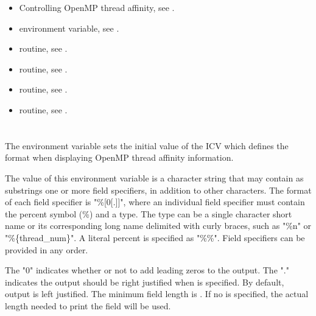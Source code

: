 \crossreferences
\begin{itemize}

\item Controlling OpenMP thread affinity, see
.
\item {} environment variable, see
.
\item {} routine, see .
\item {} routine, see .
\item {} routine, see .
\item {} routine, see .
\end{itemize}


\section{}
\label{sec:OMP_AFFINITY_FORMAT}

The  environment variable sets the initial value of the
 ICV which defines the format when displaying OpenMP
thread affinity information.


The value of this environment variable is a character string that may contain as
substrings one or more field specifiers, in addition to other characters.
The format of each field specifier is "\%[0[.]]",
where an individual field specifier must contain the percent symbol (\%) and a type.
The type can be a single character short name or its corresponding long name delimited with curly braces,
 such as "\%n" or "\%\{thread\_num\}".
A literal percent is specified as "\%\%".  Field specifiers can be provided in any order.

The "0" indicates whether or not to add leading zeros to the output.
The "." indicates the output should be right justified when  is specified.
By default, output is left justified.
The minimum field length is .
If no  is specified, the actual length needed to print the field will be used.


